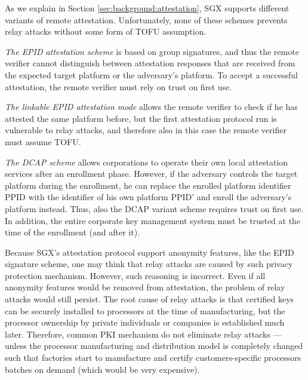 As we explain in Section \ref{sec:background:attestation}, SGX supports different variants of remote attestation. Unfortunately, none of these schemes prevents relay attacks without some form of TOFU assumption.

\begin{mylist}
	\item \emph{The EPID attestation scheme} is based on group signatures, and thus the remote verifier cannot distinguish between attestation responses that are received from the expected target platform or the adversary's platform. To accept a successful attestation, the remote verifier must rely on trust on first use. 

	\item \emph{The linkable EPID attestation mode} allows the remote verifier to check if he has attested the same platform before, but the first attestation protocol run is vulnerable to relay attacks, and therefore also in this case the remote verifier must assume TOFU. 

	\item \emph{The DCAP scheme} allows corporations to operate their own local attestation services after an enrollment phase. However, if the adversary controls the target platform during the enrollment, he can replace the enrolled platform identifier PPID with the identifier of his own platform PPID' and enroll the adversary's platform instead. Thus, also the DCAP variant scheme requires trust on first use. In addition, the entire corporate key management system must be trusted at the time of the enrollment (and after it).
\end{mylist}

\parasaver
{}
Because SGX's attestation protocol support anonymity features, like the EPID signature scheme, one may think that relay attacks are caused by such privacy protection mechanism. However, such reasoning is incorrect. Even if all anonymity features would be removed from attestation, the problem of relay attacks would still persist. The root cause of relay attacks is that certified keys can be securely installed to processors at the time of manufacturing, but the processor ownership by private individuals or companies is established much later. Therefore, common PKI mechanism do not eliminate relay attacks --- unless the processor manufacturing and distribution model is completely changed such that factories start to manufacture and certify customers-specific processors batches on demand (which would be very expensive).

